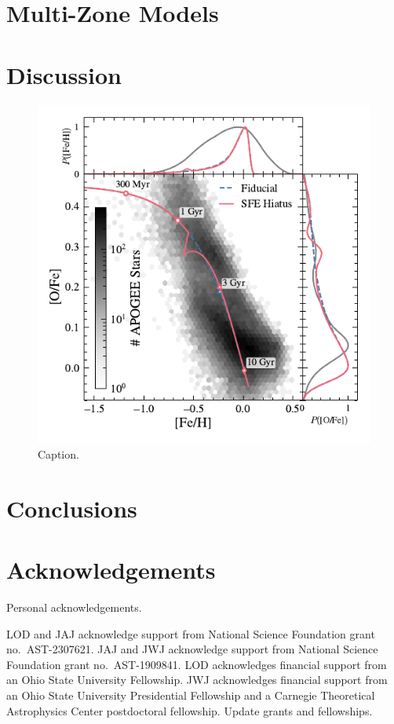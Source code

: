 \documentclass[twocolumn,twocolappendix,linenumbers]{aastex631}
\newcommand{\todo}[1]{{\color{red}#1}}
\begin{document}
\section{Multi-Zone Models}
\label{sec:multizone-results}

\section{Discussion}
\label{sec:discussion}

\begin{figure}
    \centering
    \includegraphics{figures/onezone_sfe_hiatus.pdf}
    \caption{Caption.}
    \label{fig:onezone-sfe-hiatus}
\end{figure}

\section{Conclusions}
\label{sec:conclusions}

\section*{Acknowledgements}

\todo{Personal acknowledgements.}

LOD and JAJ acknowledge support from National Science Foundation grant no.\ AST-2307621. JAJ and JWJ acknowledge support from National Science Foundation grant no.\ AST-1909841.
LOD acknowledges financial support from an Ohio State University Fellowship.
JWJ acknowledges financial support from an Ohio State University Presidential Fellowship and a Carnegie Theoretical Astrophysics Center postdoctoral fellowship. \todo{Update grants and fellowships.}
\end{document}
